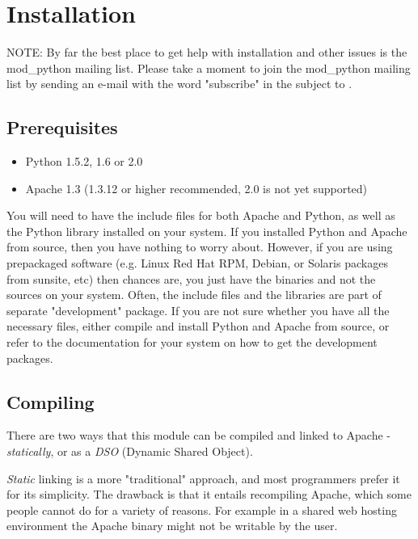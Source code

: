 \chapter{Installation\label{installation}}

NOTE: By far the best place to get help with installation and other
issues is the mod_python mailing list. Please take a moment to join
the mod_python mailing list by sending an e-mail with the word
"subscribe" in the subject to .

\section{Prerequisites\label{inst-prerequisites}}

\begin{itemize}
\item
Python 1.5.2, 1.6 or 2.0
\item
Apache 1.3 (1.3.12 or higher recommended, 2.0 is not yet supported) 
\end{itemize}

You will need to have the include files for both Apache and Python, as
well as the Python library installed on your system.  If you installed
Python and Apache from source, then you have nothing to worry
about. However, if you are using prepackaged software (e.g. Linux Red
Hat RPM, Debian, or Solaris packages from sunsite, etc) then chances
are, you just have the binaries and not the sources on your
system. Often, the include files and the libraries are part of
separate "development" package. If you are not sure whether you have
all the necessary files, either compile and install Python and Apache
from source, or refer to the documentation for your system on how to
get the development packages.

\section{Compiling\label{inst-compiling}}

There are two ways that this module can be compiled and linked to
Apache - \emph{statically}, or as a \emph{DSO} (Dynamic Shared Object).

\emph{Static} linking is a more "traditional" approach, and most programmers
prefer it for its simplicity. The drawback is that it entails
recompiling Apache, which some people cannot do for a variety of
reasons. For example in a shared web hosting environment the Apache
binary might not be writable by the user.

